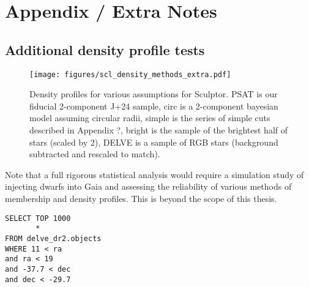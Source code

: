 \section{Appendix / Extra Notes}\label{appendix-extra-notes}

\subsection{Additional density profile
tests}\label{additional-density-profile-tests}

\begin{figure}
\centering
\texttt{[image: figures/scl\_density\_methods\_extra.pdf]}
\caption[Density profiles]{Density profiles for various assumptions for
Sculptor. PSAT is our fiducial 2-component J+24 sample, circ is a
2-component bayesian model assuming circular radii, simple is the series
of simple cuts described in Appendix ?, bright is the sample of the
brightest half of stars (scaled by 2), DELVE is a sample of RGB stars
(background subtracted and rescaled to
match).}\label{fig:sculptor_observed_profiles}
\end{figure}

Note that a full rigorous statistical analysis would require a
simulation study of injecting dwarfs into Gaia and assessing the
reliability of various methods of membership and density profiles. This
is beyond the scope of this thesis.

\begin{verbatim}
SELECT TOP 1000
       *
FROM delve_dr2.objects
WHERE 11 < ra
and ra < 19
and -37.7 < dec
and dec < -29.7
\end{verbatim}
